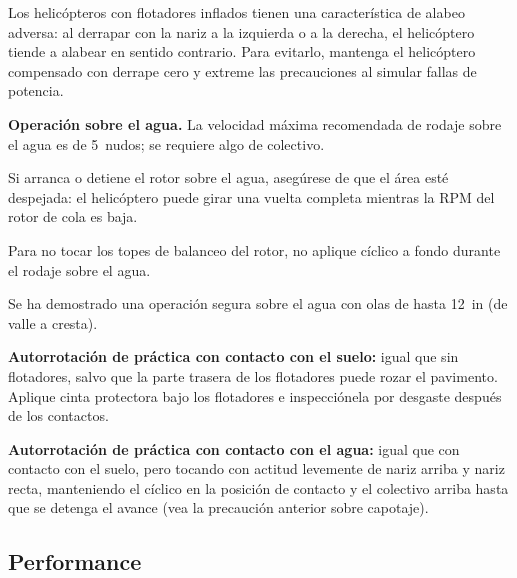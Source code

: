 \begin{precaucion}
Los helicópteros con flotadores inflados tienen una característica de alabeo adversa: al derrapar con la nariz a la izquierda o a la derecha, el helicóptero tiende a alabear en sentido contrario. Para evitarlo, mantenga el helicóptero compensado con derrape cero y extreme las precauciones al simular fallas de potencia.
\end{precaucion}

\textbf{Operación sobre el agua.} La velocidad máxima recomendada de rodaje sobre el agua es de 5~nudos; se requiere algo de colectivo.

\begin{precaucion}
Si arranca o detiene el rotor sobre el agua, asegúrese de que el área esté despejada: el helicóptero puede girar una vuelta completa mientras la RPM del rotor de cola es baja.
\end{precaucion}

\begin{precaucion}
Para no tocar los topes de balanceo del rotor, no aplique cíclico a fondo durante el rodaje sobre el agua.
\end{precaucion}

\begin{nota}
Se ha demostrado una operación segura sobre el agua con olas de hasta 12~in (de valle a cresta).
\end{nota}

\textbf{Autorrotación de práctica con contacto con el suelo:} igual que sin flotadores, salvo que la parte trasera de los flotadores puede rozar el pavimento. Aplique cinta protectora bajo los flotadores e inspecciónela por desgaste después de los contactos.

\textbf{Autorrotación de práctica con contacto con el agua:} igual que con contacto con el suelo, pero tocando con actitud levemente de nariz arriba y nariz recta, manteniendo el cíclico en la posición de contacto y el colectivo arriba hasta que se detenga el avance (vea la precaución anterior sobre capotaje).

\subsection{Performance}


